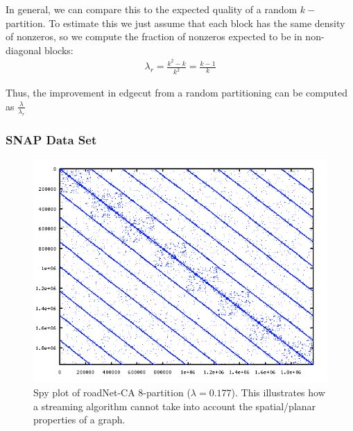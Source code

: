 \documentclass[11pt]{article}
\begin{document}
In general, we can compare this to the expected quality of a random $k-$partition. To estimate this we just assume that each block has the same density of nonzeros, so we compute the fraction of nonzeros expected to be in non-diagonal blocks:
\begin{align}\lambda_r = \frac{k^2 - k}{k^2} = \frac{k-1}{k} \end{align}

Thus, the improvement in edgecut from a random partitioning can be computed as $\frac{\lambda}{\lambda_r}$

\subsubsection{SNAP Data Set}
\begin{figure}[h!]
\centering
\includegraphics[scale=.60] {figures/roadNet-CA8.png}
\caption[Caption for]{Spy plot of roadNet-CA 8-partition ($\lambda=0.177$). This illustrates how a streaming algorithm cannot take into account the spatial/planar properties of a graph.}
\label{fig:4}
\end{figure}
\end{document}
